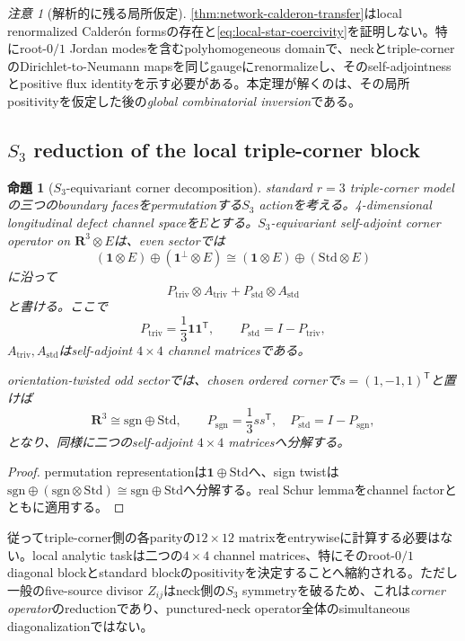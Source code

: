\documentclass[11pt,a4paper]{ltjsarticle}
\newtheorem{proposition}[theorem]{命題}
\theoremstyle{definition}
\theoremstyle{remark}
\newtheorem{remark}[theorem]{注意}
\newcommand{\RR}{\mathbf R}
\newcommand{\one}{\mathbf 1}
\begin{document}
\begin{remark}[解析的に残る局所仮定]
\cref{thm:network-calderon-transfer}はlocal renormalized Calder\'on formsの存在と\eqref{eq:local-star-coercivity}を証明しない。特にroot-$0/1$ Jordan modesを含むpolyhomogeneous domainで、neckとtriple-cornerのDirichlet-to-Neumann mapsを同じgaugeにrenormalizeし、そのself-adjointnessとpositive flux identityを示す必要がある。本定理が解くのは、その局所positivityを仮定した後の\emph{global combinatorial inversion}である。
\end{remark}

\subsection{$S_3$ reduction of the local triple-corner block}

\begin{proposition}[$S_3$-equivariant corner decomposition]\label{prop:S3-corner-decomposition}
standard $r=3$ triple-corner modelの三つのboundary facesをpermutationする$S_3$ actionを考える。4-dimensional longitudinal defect channel spaceを$E$とする。$S_3$-equivariant self-adjoint corner operator on $\RR^3\otimes E$は、even sectorでは
\[
 (\one\otimes E)\oplus(\one^\perp\otimes E)
 \cong(\mathbf1\otimes E)\oplus(\mathrm{Std}\otimes E)
\]
に沿って
\begin{equation}\label{eq:S3-even-block}
 P_{\mathrm{triv}}\otimes A_{\mathrm{triv}}
 +P_{\mathrm{std}}\otimes A_{\mathrm{std}}
\end{equation}
と書ける。ここで
\[
 P_{\mathrm{triv}}=\frac13\one\one^{\mathsf T},
 \qquad
 P_{\mathrm{std}}=I-P_{\mathrm{triv}},
\]
$A_{\mathrm{triv}},A_{\mathrm{std}}$はself-adjoint $4\times4$ channel matricesである。

orientation-twisted odd sectorでは、chosen ordered cornerで$s=(1,-1,1)^{\mathsf T}$と置けば
\[
 \RR^3\cong\mathrm{sgn}\oplus\mathrm{Std},
 \qquad
 P_{\mathrm{sgn}}=\frac13ss^{\mathsf T},
 \quad P_{\mathrm{std}}^-=I-P_{\mathrm{sgn}},
\]
となり、同様に二つのself-adjoint $4\times4$ matricesへ分解する。
\end{proposition}

\begin{proof}
permutation representationは$\mathbf1\oplus\mathrm{Std}$へ、sign twistは$\mathrm{sgn}\oplus(\mathrm{sgn}\otimes\mathrm{Std})\cong\mathrm{sgn}\oplus\mathrm{Std}$へ分解する。real Schur lemmaをchannel factorとともに適用する。
\end{proof}

従ってtriple-corner側の各parityの$12\times12$ matrixをentrywiseに計算する必要はない。local analytic taskは二つの$4\times4$ channel matrices、特にそのroot-$0/1$ diagonal blockとstandard blockのpositivityを決定することへ縮約される。ただし一般のfive-source divisor $Z_{ij}$はneck側の$S_3$ symmetryを破るため、これは\emph{corner operator}のreductionであり、punctured-neck operator全体のsimultaneous diagonalizationではない。
\end{document}
